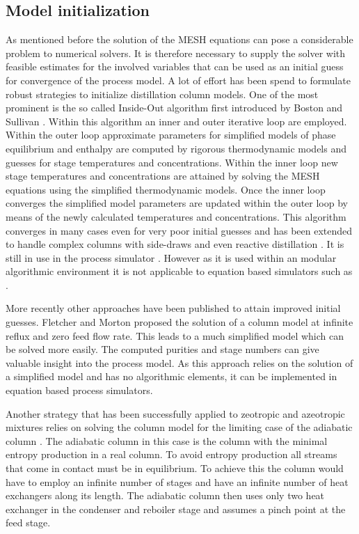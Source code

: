     \subsection{Model initialization}
    \label{sec:mathpro:steady:specinit}
        As mentioned before the solution of the MESH equations can pose a considerable problem
        to numerical solvers. It is therefore necessary to supply the solver with feasible
        estimates for the involved variables that can be used as an initial guess for
        convergence of the process model. A lot of effort has been spend to formulate robust strategies
        to initialize distillation column models. One of the most prominent is the so called
        Inside-Out algorithm first introduced by Boston and Sullivan \cite{Boston.1974}. Within this
        algorithm an inner and outer iterative loop are employed. Within the outer loop approximate
        parameters for simplified models of phase equilibrium and enthalpy are computed by rigorous
        thermodynamic models and guesses for stage temperatures and concentrations. Within the
        inner loop new stage temperatures and concentrations are attained by solving the MESH equations
        using the simplified thermodynamic models. Once the inner loop converges the simplified
        model parameters are updated within the outer loop by means of the newly calculated
        temperatures and concentrations. This algorithm converges in many cases even for very poor initial
        guesses and has been extended to handle complex columns with side-draws and even reactive
        distillation \cite{Boston.}. It is still in use in the process simulator \aspen.
        However as it is used within an modular algorithmic environment it is not applicable
        to equation based simulators such as \gproms.

        More recently other approaches have been published to attain improved initial guesses.
        Fletcher and Morton \cite{Fletcher.2000} proposed the solution of a column model at
        infinite reflux and zero feed flow rate. This leads to a much simplified model which can
        be solved more easily. The computed purities and stage numbers can give valuable insight
        into the process model. As this approach relies on the solution of a simplified model
        and has no algorithmic elements, it can be implemented in equation based process simulators.

        Another strategy that has been successfully applied to zeotropic and azeotropic mixtures
        relies on solving the column model for the limiting case of the adiabatic column \cite{Barttfeld.2002}.
        The adiabatic column in this case is the column with the minimal entropy production in a real column.
        To avoid entropy production all streams that come in contact must be in equilibrium. To achieve this
        the column would have to employ an infinite number of stages and have an infinite number of
        heat exchangers along its length. The adiabatic column then uses only two heat exchanger in the
        condenser and reboiler stage and assumes a pinch point at the feed stage. 

